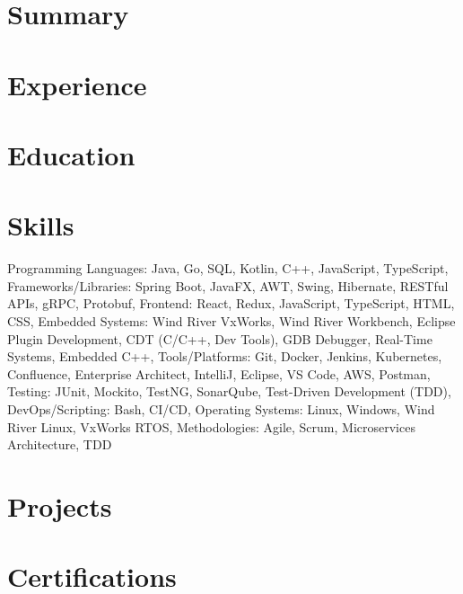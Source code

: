 \documentclass[11pt,a4paper]{moderncv}
\begin{document}
\makecvtitle

\section{Summary}


\section{Experience}


\section{Education}


\section{Skills}
Programming Languages: Java, Go, SQL, Kotlin, C++, JavaScript, TypeScript, Frameworks/Libraries: Spring Boot, JavaFX, AWT, Swing, Hibernate, RESTful APIs, gRPC, Protobuf, Frontend: React, Redux, JavaScript, TypeScript, HTML, CSS, Embedded Systems: Wind River VxWorks, Wind River Workbench, Eclipse Plugin Development, CDT (C/C++, Dev Tools), GDB Debugger, Real-Time Systems, Embedded C++, Tools/Platforms: Git, Docker, Jenkins, Kubernetes, Confluence, Enterprise Architect, IntelliJ, Eclipse, VS Code, AWS, Postman, Testing: JUnit, Mockito, TestNG, SonarQube, Test-Driven Development (TDD), DevOps/Scripting: Bash, CI/CD, Operating Systems: Linux, Windows, Wind River Linux, VxWorks RTOS, Methodologies: Agile, Scrum, Microservices Architecture, TDD

\section{Projects}


\section{Certifications}
\end{document}
